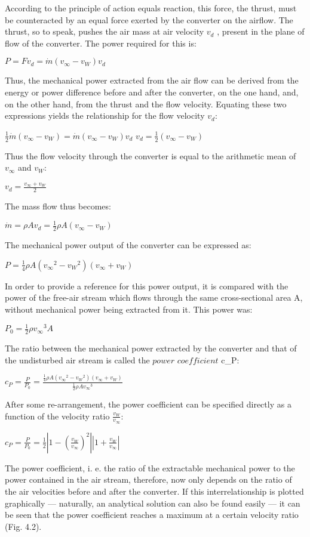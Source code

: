 According to the principle of action equals reaction, this force, the thrust, must be counteracted by an equal force exerted by the converter on the airflow. The thrust, so to speak, pushes the air mass at air velocity $v_d$ , present in the plane of flow of the converter. The power required for this is:

$P = F v_d = \dot{m}(v_{\infty} - v_W) v_d$

Thus, the mechanical power extracted from the air flow can be derived from the energy or power difference before and after the converter, on the one hand, and, on the other hand, from the thrust and the flow velocity. Equating these two expressions yields the relationship for the flow velocity $v_d$:

$\frac{1}{2}\dot{m} (v_{\infty} - v_W) = \dot{m} (v_{\infty} - v_W) v_d$
$v_d = \frac{1}{2} (v_{\infty} - v_W)$

Thus the flow velocity through the converter is equal to the arithmetic mean of $v_{\infty}$ and $v_W$:

$v_d = \frac{v_{\infty} + v_W}{2}$

The mass flow thus becomes:

$\dot{m} = \rho A v_d = \frac{1}{2} \rho A (v_{\infty} - v_W)$

The mechanical power output of the converter can be expressed as:

$P = \frac{1}{4} \rho A ({v_{\infty}}^2 - {v_W}^2) (v_{\infty} + v_W)$

In order to provide a reference for this power output, it is compared with the power of the free-air stream which flows through the same cross-sectional area A, without mechanical power being extracted from it. This power was:

$P_0 = \frac{1}{2}\rho {v_{\infty}}^3 A$

The ratio between the mechanical power extracted by the converter and that of the undisturbed air stream is called the $power$ $coefficient$ c_P:

$c_P = \frac{P}{P_0} = \frac{\frac{1}{4} \rho A ({v_{\infty}}^2 - {v_W}^2)(v_{\infty} + v_W)}{\frac{1}{2}\rho A {v_{\infty}}^3}$

After some re-arrangement, the power coefficient can be specified directly as a function of the velocity ratio $\frac{v_W}{v_{\infty}}$:

$c_P = \frac{P}{P_0} = \frac{1}{2} |1-(\frac{v_W}{v_{\infty}})^2| |1+\frac{v_W}{v_{\infty}}|$

The power coefficient, i. e. the ratio of the extractable mechanical power to the power contained in the air stream, therefore, now only depends on the ratio of the air velocities before and after the converter. If this interrelationship is plotted graphically — naturally, an analytical solution can also be found easily — it can be seen that the power coefficient reaches a maximum at a certain velocity ratio (Fig. 4.2).

